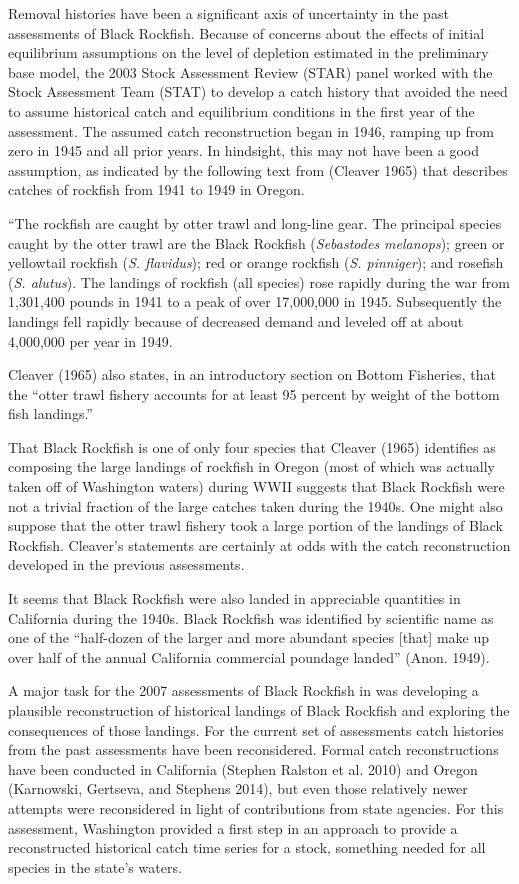 \documentclass[11pt,
  english,
  letterpaper,
]{article}
\begin{document}
Removal histories have been a significant axis of uncertainty in the past assessments of Black Rockfish. Because of concerns about the effects of initial equilibrium assumptions on the level of depletion estimated in the preliminary base model, the 2003 Stock Assessment Review (STAR) panel worked with the Stock Assessment Team (STAT) to develop a catch history that avoided the need to assume historical catch and equilibrium conditions in the first year of the assessment. The assumed catch reconstruction began in 1946, ramping up from zero in 1945 and all prior years. In hindsight, this may not have been a good assumption, as indicated by the following text from (Cleaver 1965) that describes catches of rockfish from 1941 to 1949 in Oregon.

``The rockfish are caught by otter trawl and long-line gear. The principal species caught by the otter trawl are the Black Rockfish (\emph{Sebastodes melanops}); green or yellowtail rockfish (\emph{S. flavidus}); red or orange rockfish (\emph{S. pinniger}); and rosefish (\emph{S. alutus}). The landings of rockfish (all species) rose rapidly during the war from 1,301,400 pounds in 1941 to a peak of over 17,000,000 in 1945. Subsequently the landings fell rapidly because of decreased demand and leveled off at about 4,000,000 per year in 1949.

Cleaver (1965) also states, in an introductory section on Bottom Fisheries, that the ``otter trawl fishery accounts for at least 95 percent by weight of the bottom fish landings.''

That Black Rockfish is one of only four species that Cleaver (1965) identifies as composing the large landings of rockfish in Oregon (most of which was actually taken off of Washington waters) during WWII suggests that Black Rockfish were not a trivial fraction of the large catches taken during the 1940s. One might also suppose that the otter trawl fishery took a large portion of the landings of Black Rockfish. Cleaver's statements are certainly at odds with the catch reconstruction developed in the previous assessments.

It seems that Black Rockfish were also landed in appreciable quantities in California during the 1940s. Black Rockfish was identified by scientific name as one of the ``half-dozen of the larger and more abundant species {[}that{]} make up over half of the annual California commercial poundage landed'' (Anon. 1949).

A major task for the 2007 assessments of Black Rockfish in was developing a plausible reconstruction of historical landings of Black Rockfish and exploring the consequences of those landings. For the current set of assessments catch histories from the past assessments have been reconsidered. Formal catch reconstructions have been conducted in California (Stephen Ralston et al. 2010) and Oregon (Karnowski, Gertseva, and Stephens 2014), but even those relatively newer attempts were reconsidered in light of contributions from state agencies. For this assessment, Washington provided a first step in an approach to provide a reconstructed historical catch time series for a stock, something needed for all species in the state's waters.
\end{document}
